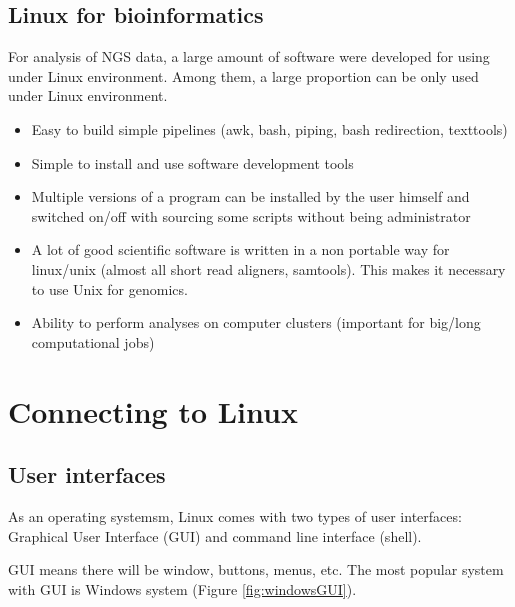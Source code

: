 \documentclass[]{book}
\providecommand{\tightlist}{%
  \setlength{\itemsep}{0pt}\setlength{\parskip}{0pt}}
\begin{document}
\hypertarget{linux-for-bioinformatics}{%
\section{Linux for bioinformatics}\label{linux-for-bioinformatics}}

For analysis of NGS data, a large amount of software were developed for using under Linux environment. Among them, a large proportion can be only used under Linux environment.

\begin{itemize}
\tightlist
\item
  Easy to build simple pipelines
  (awk, bash, piping, bash redirection, texttools)
\item
  Simple to install and use software development tools
\item
  Multiple versions of a program can be installed by the user himself and switched on/off with sourcing some scripts without being administrator
\item
  A lot of good scientific software is written in a non portable way for linux/unix (almost all short read aligners, samtools). This makes it necessary to use Unix for genomics.
\item
  Ability to perform analyses on computer clusters (important for big/long computational jobs)
\end{itemize}

\hypertarget{connecting-to-linux}{%
\chapter{Connecting to Linux}\label{connecting-to-linux}}

\hypertarget{user-interfaces}{%
\section{User interfaces}\label{user-interfaces}}

As an operating systemsm, Linux comes with two types of user interfaces: Graphical User Interface (GUI) and command line interface (shell).

GUI means there will be window, buttons, menus, etc. The most popular system with GUI is Windows system (Figure \ref{fig:windowsGUI}).
\end{document}
